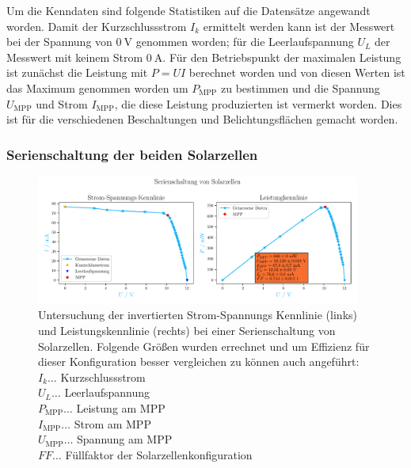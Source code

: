 \documentclass[12pt,english,ngerman]{scrartcl}
\begin{document}
Um die Kenndaten sind folgende Statistiken auf die Datensätze angewandt worden.
Damit der Kurzschlussstrom $I_k$ ermittelt werden kann ist der Messwert bei der
Spannung von $\SI{0}{\volt}$ genommen worden; für die Leerlaufspannung $U_L$
der Messwert mit keinem Strom $\SI{0}{\ampere}$. Für den Betriebspunkt der
maximalen Leistung ist zunächst die Leistung mit $P=UI$ berechnet worden und
von diesen Werten ist das Maximum genommen worden um $P_\text{MPP}$ zu
bestimmen und die Spannung $U_\text{MPP}$ und Strom $I_\text{MPP}$, die diese
Leistung produzierten ist vermerkt worden. Dies ist für die verschiedenen
Beschaltungen und Belichtungsflächen gemacht worden.

\subsubsection{Serienschaltung der beiden Solarzellen}
\begin{figure}[H]
	\centering
	\includegraphics[width=0.95\textwidth]{figures/serienschaltung.pdf}
	\caption[Kennlinien Serienschaltung Solarzellen]{ Untersuchung der invertierten
		Strom-Spannungs Kennlinie (links) und Leistungskennlinie (rechts) bei einer
		Serienschaltung von Solarzellen. Folgende Größen wurden errechnet und um
		Effizienz für dieser Konfiguration besser vergleichen zu können auch angeführt: \\
		$I_k \dots$ Kurzschlussstrom                                                    \\
		$U_L \dots$ Leerlaufspannung                                                    \\
		$P_\text{MPP} \dots$ Leistung am MPP                                            \\
		$I_\text{MPP} \dots$ Strom am MPP                                               \\
		$U_\text{MPP} \dots$ Spannung am MPP                                            \\
		$FF \dots$ Füllfaktor der Solarzellenkonfiguration
	}\label{fig:auws_kennlinie_serie}
\end{figure}
\end{document}

